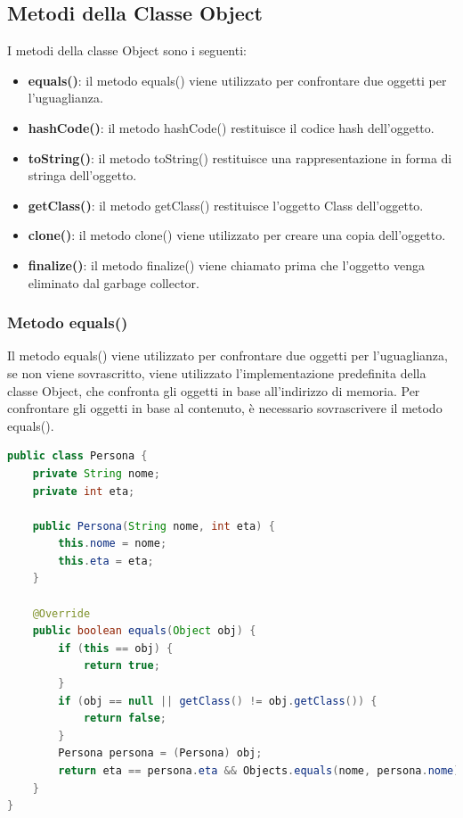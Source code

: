 \documentclass[11pt]{article}
\begin{document}
\subsection{Metodi della Classe Object}
I metodi della classe Object sono i seguenti:
\begin{itemize}
    \item \textbf{equals()}: il metodo equals() viene utilizzato per confrontare due oggetti per l'uguaglianza.
    \item \textbf{hashCode()}: il metodo hashCode() restituisce il codice hash dell'oggetto.
    \item \textbf{toString()}: il metodo toString() restituisce una rappresentazione in forma di stringa dell'oggetto.
    \item \textbf{getClass()}: il metodo getClass() restituisce l'oggetto Class dell'oggetto.
    \item \textbf{clone()}: il metodo clone() viene utilizzato per creare una copia dell'oggetto.
    \item \textbf{finalize()}: il metodo finalize() viene chiamato prima che l'oggetto venga eliminato dal garbage collector.
\end{itemize}
\subsubsection{Metodo equals()}
Il metodo equals() viene utilizzato per confrontare due oggetti per l'uguaglianza, se non viene sovrascritto, viene utilizzato l'implementazione predefinita della classe Object,
che confronta gli oggetti in base all'indirizzo di memoria. Per confrontare gli oggetti in base al contenuto, è necessario sovrascrivere il metodo equals().
\begin{lstlisting}[language=Java]
public class Persona {
    private String nome;
    private int eta;

    public Persona(String nome, int eta) {
        this.nome = nome;
        this.eta = eta;
    }

    @Override
    public boolean equals(Object obj) {
        if (this == obj) {
            return true;
        }
        if (obj == null || getClass() != obj.getClass()) {
            return false;
        }
        Persona persona = (Persona) obj;
        return eta == persona.eta && Objects.equals(nome, persona.nome);
    }
}
\end{lstlisting}
\end{document}
